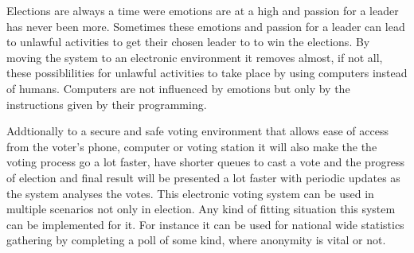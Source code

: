 Elections are always a time were emotions are at a high and passion for a leader has never been more. Sometimes these emotions and passion for a leader can lead to unlawful activities to get their chosen leader to to win the elections. By moving the system to an electronic environment it removes almost, if not all, these possiblilities for unlawful activities to take place by using computers instead of humans. Computers are not influenced by emotions but only by the instructions given by their programming.
	
Addtionally to a secure and safe voting environment that allows ease of access from the voter's phone, computer or voting station it will also make the the voting process go a lot faster, have shorter queues to cast a vote and the progress of election and final result will be presented a lot faster with periodic updates as the system analyses the votes. This electronic voting system can be used in multiple scenarios not only in election. Any kind of fitting situation this system can be implemented for it. For instance it can be used for national wide statistics gathering by completing a poll of some kind, where anonymity is vital or not.